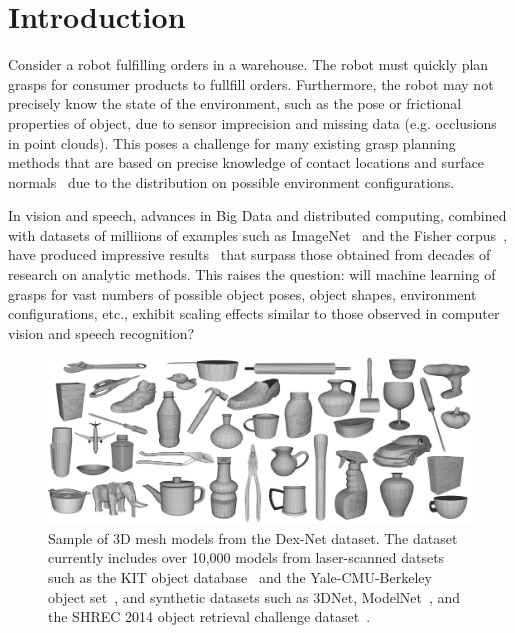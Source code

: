 \section{Introduction}

Consider a robot fulfilling orders in a warehouse.
The robot must quickly plan grasps for consumer products to fullfill orders.
Furthermore, the robot may not precisely know the state of the environment, such as the pose or frictional properties of object, due to sensor imprecision and missing data (e.g. occlusions in point clouds).
This poses a challenge for many existing grasp planning methods that are based on precise knowledge of contact locations and surface normals~\cite{ciocarlie2009, ferrari1992} due to the distribution on possible environment configurations.

In vision and speech, advances in Big Data and distributed computing, combined with datasets of milliions of examples such as ImageNet~\cite{deng2009imagenet} and the Fisher corpus~\cite{cieri2004fisher}, have produced impressive results~\cite{hannun2014deepspeech, hays2008im2gps, krizhevsky2012imagenet} that surpass those obtained from decades of research on analytic methods.
This raises the question: will machine learning of grasps for vast numbers of possible object poses, object shapes, environment configurations, etc., exhibit scaling effects similar to those observed in computer vision and speech recognition?

\begin{figure}[t!]
\centering
\includegraphics[scale=0.085]{figures/dexnet_collage.jpg}
\caption{Sample of 3D mesh models from the Dex-Net dataset. The dataset currently includes over 10,000 models from laser-scanned datsets such as the KIT object database~\cite{kasper2012kit} and the Yale-CMU-Berkeley object set~\cite{calli2015benchmarking}, and synthetic datasets such as 3DNet\cite{wohlkinger20123dnet}, ModelNet~\cite{wu20143d}, and the SHREC 2014 object retrieval challenge dataset~\cite{li2015comparison}. }
\vspace*{-15pt}
\end{figure}

